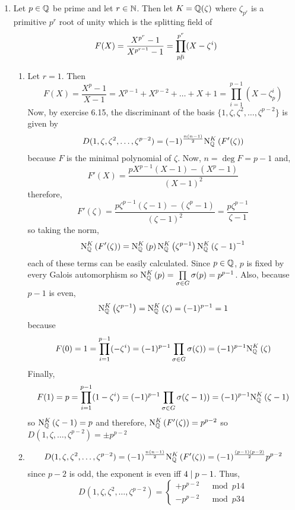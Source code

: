 \documentclass[12pt]{extarticle}
\begin{document}
\begin{enumerate}
\item Let $p \in \mathbb{Q}$ be prime and let $r \in \mathbb{N}$. Then let $K = \mathbb{Q}(\zeta)$ where $\zeta_{p^r}$ is a primitive $p^r$ root of unity which is the splitting field of \[F(X) = \frac{X^{p^r} - 1}{X^{p^{r-1}} - 1} = \prod_{p \ndivides i}^{p^r} (X - \zeta^i) \] 

\begin{enumerate}
\item Let $r = 1$. Then \[F(X) = \frac{X^p - 1}{X-1} = X^{p-1} + X^{p-2} + \dots + X + 1 = \prod_{i = 1}^{p-1} (X - \zeta_p^i)\] Now, by exercise 6.15, the discriminant of the basis $\{1, \zeta, \zeta^2, \dots, \zeta^{p-2}\}$ is given by \[D(1, \zeta, \zeta^2, \dots, \zeta^{p-2}) = (-1)^{\frac{n(n-1)}{2}} \mathrm{N}^{K}_{\mathbb{Q}}\left(F'(\zeta)\right)\] because $F$ is the minimal polynomial of $\zeta$. Now, $n = \deg{F} = p - 1$ and, \[F'(X) = \frac{p X^{p - 1} (X - 1) - (X^p - 1)}{(X - 1)^2}\] 
therefore, 
\[F'(\zeta) = \frac{p \zeta^{p - 1} (\zeta - 1) - (\zeta^p - 1)}{(\zeta - 1)^2} = \frac{p \zeta^{p - 1}} {\zeta - 1}\] 
so taking the norm, \[\mathrm{N}^{K}_{\mathbb{Q}}\left(F'(\zeta)\right) = \mathrm{N}^{K}_{\mathbb{Q}}\left(p\right) \mathrm{N}^{K}_{\mathbb{Q}}\left(\zeta^{p-1}\right) \mathrm{N}^{K}_{\mathbb{Q}}\left(\zeta - 1 \right)^{-1}\]
each of these terms can be easily calculated. Since $p \in \mathbb{Q}$, $p$ is fixed by every Galois automorphism so $\mathrm{N}^{K}_{\mathbb{Q}}\left(p\right) = \prod\limits_{\sigma \in G} \sigma(p) =  p^{p-1}$. Also, because $p-1$ is even, \[\mathrm{N}^{K}_{\mathbb{Q}}\left(\zeta^{p-1}\right) = \mathrm{N}^{K}_{\mathbb{Q}}\left(\zeta\right) = (-1)^{p-1} = 1\] because \[F(0) = 1 = \prod_{i = 1}^{p-1} (-\zeta^i) = (-1)^{p-1} \prod_{\sigma \in G} \sigma(\zeta)) = (-1)^{p-1} \mathrm{N}^{K}_{\mathbb{Q}}\left(\zeta\right)\]
Finally, \[F(1) = p = \prod_{i = 1}^{p-1} (1-\zeta^i) = (-1)^{p-1} \prod_{\sigma \in G} \sigma(\zeta - 1)) = (-1)^{p-1} \mathrm{N}^{K}_{\mathbb{Q}}\left(\zeta - 1\right)\]
so $\mathrm{N}^{K}_{\mathbb{Q}}\left(\zeta - 1\right) = p$ and therefore, $\mathrm{N}^{K}_{\mathbb{Q}}\left(F'(\zeta)\right) = p^{p - 2}$ so $D(1, \zeta, \dots, \zeta^{p-2}) = \pm p^{p - 2}$
\item \[D(1, \zeta, \zeta^2, \dots, \zeta^{p-2}) = (-1)^{\frac{n(n-1)}{2}} \mathrm{N}^{K}_{\mathbb{Q}}\left(F'(\zeta)\right) = (-1)^{\frac{(p-1)(p-2)}{2}} p^{p-2}\]
since $p-2$ is odd, the exponent is even iff $4 \mid p - 1$. Thus, 
\[D(1, \zeta, \zeta^2, \dots, \zeta^{p-2}) =  
\begin{cases} 
+ p^{p-2} & \mod{p}{1}{4} \\
- p^{p-2} & \mod{p}{3}{4}
\end{cases}\]


\end{enumerate}
\end{enumerate}
\end{document}
